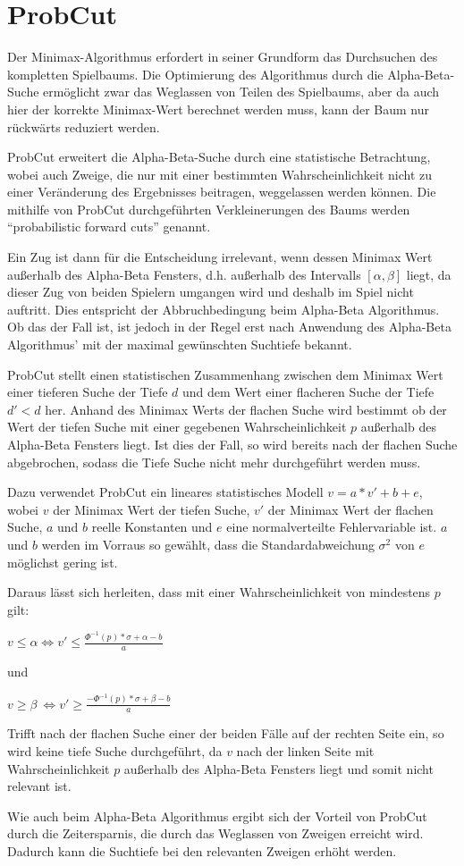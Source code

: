 \section{ProbCut}

Der Minimax-Algorithmus erfordert in seiner Grundform das Durchsuchen des kompletten Spielbaums.
Die Optimierung des Algorithmus durch die Alpha-Beta-Suche ermöglicht zwar das Weglassen von Teilen des Spielbaums, aber da auch hier der korrekte Minimax-Wert berechnet werden muss, kann der Baum nur
rückwärts reduziert werden.

ProbCut erweitert die Alpha-Beta-Suche durch eine statistische Betrachtung, wobei auch Zweige, die nur mit einer bestimmten Wahrscheinlichkeit nicht zu einer Veränderung des Ergebnisses beitragen, weggelassen werden können.
Die mithilfe von ProbCut durchgeführten Verkleinerungen des Baums werden "`probabilistic forward cuts"' genannt.

Ein Zug ist dann für die Entscheidung irrelevant, wenn dessen Minimax Wert außerhalb des Alpha-Beta Fensters, d.h. außerhalb des Intervalls \([\alpha,\beta]\) liegt, da dieser Zug von beiden Spielern umgangen wird und deshalb im Spiel nicht auftritt.
Dies entspricht der Abbruchbedingung beim Alpha-Beta Algorithmus.
Ob das der Fall ist, ist jedoch in der Regel erst nach Anwendung des Alpha-Beta Algorithmus' mit der maximal gewünschten Suchtiefe bekannt.

ProbCut stellt einen statistischen Zusammenhang zwischen dem Minimax Wert einer tieferen Suche der Tiefe \(d\) und dem Wert einer flacheren Suche der Tiefe \(d'<d\) her.
Anhand des Minimax Werts der flachen Suche wird bestimmt ob der Wert der tiefen Suche mit einer gegebenen Wahrscheinlichkeit \(p\) außerhalb des Alpha-Beta Fensters liegt.
Ist dies der Fall, so wird bereits nach der flachen Suche abgebrochen, sodass die Tiefe Suche nicht mehr durchgeführt werden muss.

Dazu verwendet ProbCut ein lineares statistisches Modell \(v=a*v'+b+e\), wobei \(v\) der Minimax Wert der tiefen Suche, \(v'\) der Minimax Wert der flachen Suche, \(a\) und \(b\) reelle Konstanten und \(e\) eine normalverteilte Fehlervariable ist.
\(a\) und \(b\) werden im Vorraus so gewählt, dass die Standardabweichung \(\sigma^{2}\) von \(e\) möglichst gering ist.

Daraus lässt sich herleiten, dass mit einer Wahrscheinlichkeit von mindestens \(p\) gilt:

\(v\leq\alpha \iff v'\leq\frac{\Phi^{-1}(p)*\sigma+\alpha-b}{a}\)

und

\(v\geq\beta\ \iff v'\geq\frac{-\Phi^{-1}(p)*\sigma+\beta-b}{a}\)

Trifft nach der flachen Suche einer der beiden Fälle auf der rechten Seite ein, so wird keine tiefe Suche durchgeführt, da \(v\) nach der linken Seite mit Wahrscheinlichkeit \(p\) außerhalb des Alpha-Beta Fensters liegt
und somit nicht relevant ist.

Wie auch beim Alpha-Beta Algorithmus ergibt sich der Vorteil von ProbCut durch die Zeitersparnis, die durch das Weglassen von Zweigen erreicht wird. Dadurch kann die Suchtiefe bei den relevanten Zweigen erhöht werden.
\cite[S.~1]{probcut}
